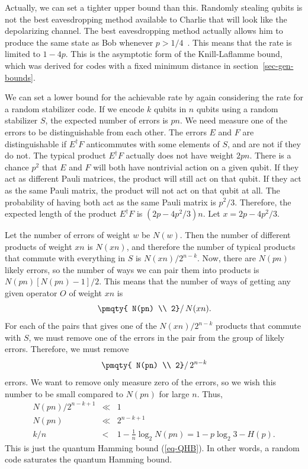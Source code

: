 Actually, we can set a tighter upper bound than this.  Randomly stealing qubits
is not the best eavesdropping method available to Charlie that will look like
the depolarizing channel.  The best eavesdropping method actually allows
him to produce the same state as Bob whenever $p > 1/4$~\cite{fuchs-KL}.
This means that the rate is limited to $1-4p$.  This is the asymptotic form
of the Knill-Laflamme bound, which was derived for codes with a fixed
minimum distance in section~\ref{sec-gen-bounds}.

We can set a lower bound for the achievable rate by again considering the
rate for a random stabilizer code.  If we encode $k$ qubits in $n$ qubits
using a random stabilizer $S$, the expected number of errors is $pn$.  We
need measure one of the errors to be distinguishable from each other.  The
errors $E$ and $F$ are distinguishable if $E^\dagger F$ anticommutes with
some elements of $S$, and are not if they do not.  The typical product
$E^\dagger F$ actually does not have weight $2pn$.  There is a chance
$p^2$ that $E$ and $F$ will both have nontrivial action on a given
qubit.  If they act as different Pauli matrices, the product will still act on
that qubit.  If they act as the same Pauli matrix, the product will not act on
that qubit at all.  The probability of having both act as the same Pauli
matrix is $p^2/3$.  Therefore, the expected length of the product
$E^\dagger F$ is $(2p - 4p^2/3)n$.  Let $x = 2p - 4p^2/3$.

Let the number of errors of weight $w$ be $N(w)$.  Then the number of
different products of weight $xn$ is $N(xn)$, and therefore the number of
typical products that commute with everything in $S$ is $N(xn) / 2^{n-k}$.
Now, there are $N(pn)$ likely errors, so the number of ways we can pair
them into products is $N(pn) [N(pn) -1]/2$.  This means that the number of
ways of getting any given operator $O$ of weight $xn$ is
\begin{equation}
	\left. \pmqty{ N(pn) \\ 2} \right/ N(xn).
\end{equation}
For each of the pairs that gives one of the $N(xn)/2^{n-k}$ products that
commute with $S$, we must remove one of the errors in the pair from the
group of likely errors.  Therefore, we must remove
\begin{equation}
	\left. \pmqty{ N(pn) \\ 2} \right/ 2^{n-k}
\end{equation}
errors.  We want to remove only measure zero of the errors, so we wish this
number to be small compared to $N(pn)$ for large $n$.  Thus,
\begin{eqnarray}
	N (pn) / 2^{n-k+1} & \ll & 1 \\
	N (pn) & \ll & 2^{n-k+1} \\
	k/n & < & 1 - \frac{1}{n} \log_2 N (pn) = 1 - p \log_2 3 - H(p).
\end{eqnarray}
This is just the quantum Hamming bound (\ref{eq-QHB}).  In other words,
a random code saturates the quantum Hamming bound.

